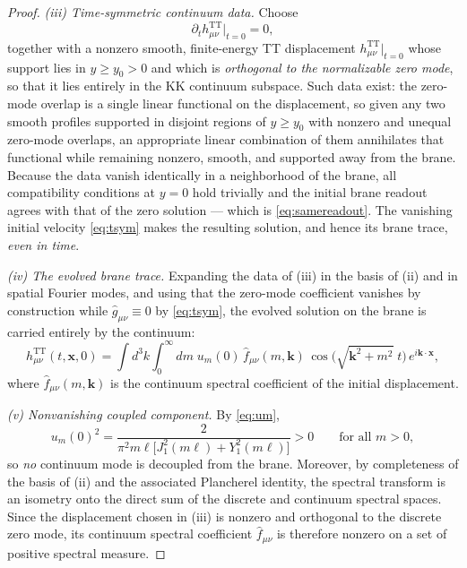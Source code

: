 \documentclass[11pt,a4paper]{article}
\theoremstyle{plain}
\theoremstyle{definition}
\newcommand{\TT}{\mathrm{TT}}
\begin{document}
\begin{proof}
\emph{(iii) Time-symmetric continuum data.} Choose
\begin{equation}
\label{eq:tsym}
\partial_t h^{\TT}_{\mu\nu}\big|_{t=0}=0,
\end{equation}
together with a nonzero smooth, finite-energy TT displacement
$h^{\TT}_{\mu\nu}\big|_{t=0}$ whose support lies in $y\ge y_0>0$ and which
is \emph{orthogonal to the normalizable zero mode}, so that it lies
entirely in the KK continuum subspace. Such data exist: the zero-mode
overlap is a single linear functional on the displacement, so given any
two smooth profiles supported in disjoint regions of $y\ge y_0$ with
nonzero and unequal zero-mode overlaps, an appropriate linear combination
of them annihilates that functional while remaining nonzero, smooth, and
supported away from the brane. Because the data vanish identically in a
neighborhood of the brane, all compatibility conditions at $y=0$ hold
trivially and the initial brane readout agrees with that of the zero
solution --- which is \eqref{eq:samereadout}. The vanishing initial
velocity \eqref{eq:tsym} makes the resulting solution, and hence its brane
trace, \emph{even in time}.

\emph{(iv) The evolved brane trace.} Expanding the data of (iii) in the
basis of (ii) and in spatial Fourier modes, and using that the zero-mode
coefficient vanishes by construction while
$\widehat g_{\mu\nu}\equiv0$ by \eqref{eq:tsym}, the evolved solution on
the brane is carried entirely by the continuum:
\begin{equation}
\label{eq:branetrace}
h^{\TT}_{\mu\nu}(t,\mathbf x,0)
=\int d^3k\int_0^\infty dm\;
u_m(0)\,\widehat f_{\mu\nu}(m,\mathbf k)\,
\cos\!\bigl(\sqrt{\mathbf k^2+m^2}\;t\bigr)\,
e^{i\mathbf k\cdot\mathbf x},
\end{equation}
where $\widehat f_{\mu\nu}(m,\mathbf k)$ is the continuum spectral
coefficient of the initial displacement.

\emph{(v) Nonvanishing coupled component.} By \eqref{eq:um},
\begin{equation}
\label{eq:upos}
u_m(0)^2
=\frac{2}{\pi^2m\ell\bigl[J_1^2(m\ell)+Y_1^2(m\ell)\bigr]}>0
\qquad\text{for all }m>0,
\end{equation}
so \emph{no} continuum mode is decoupled from the brane. Moreover, by
completeness of the basis of (ii) and the associated Plancherel identity,
the spectral transform is an isometry onto the direct sum of the discrete
and continuum spectral spaces. Since the displacement chosen in (iii) is
nonzero and orthogonal to the discrete zero mode, its continuum spectral
coefficient $\widehat f_{\mu\nu}$ is therefore nonzero on a set of
positive spectral measure.


\end{proof}
\end{document}
